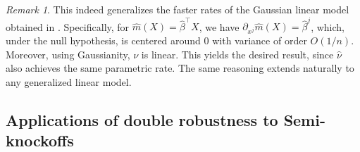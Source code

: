 \documentclass{article}
\theoremstyle{plain}
\theoremstyle{definition}
\theoremstyle{remark}
\newtheorem{remark}[theorem]{Remark}
\begin{document}
\begin{remark}
This indeed generalizes the faster rates of the Gaussian linear model obtained in \citet{reyerolobo2025conditionalfeatureimportancerevisited}. Specifically, for $\widehat{m}(X) = \widehat{\beta}^\top X$, we have $\partial_{x^j}\widehat{m}(X) = \widehat{\beta}^j$, which, under the null hypothesis, is centered around $0$ with variance of order $O(1/n)$. Moreover, using Gaussianity, $\nu$ is linear. This yields the desired result, since $\widehat{\nu}$ also achieves the same parametric rate. The same reasoning extends naturally to any generalized linear model.
\end{remark}
%
\subsection{Applications of double robustness to Semi-knockoffs}\label{sect:conject}
 
\end{document}
